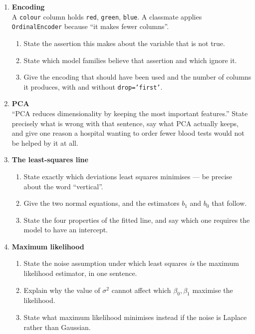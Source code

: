 \documentclass[11pt,a4paper]{article}
\begin{document}
\begin{enumerate}[label=\textbf{A\arabic*.}, leftmargin=*]
  \item \textbf{Encoding} \\
    A \texttt{colour} column holds \texttt{red}, \texttt{green}, \texttt{blue}.
    A classmate applies \texttt{OrdinalEncoder} because ``it makes fewer
    columns''.
    \begin{enumerate}[label=(\alph*), leftmargin=*]
      \item State the assertion this makes about the variable that is not true.
      \item State which model families believe that assertion and which ignore
        it.
      \item Give the encoding that should have been used and the number of
        columns it produces, with and without \texttt{drop='first'}.
    \end{enumerate}

  \item \textbf{PCA} \\
    ``PCA reduces dimensionality by keeping the most important features.''
    State precisely what is wrong with that sentence, say what PCA actually
    keeps, and give one reason a hospital wanting to order fewer blood tests
    would not be helped by it at all.

  \item \textbf{The least-squares line} \\
    \begin{enumerate}[label=(\alph*), leftmargin=*]
      \item State exactly which deviations least squares minimises --- be
        precise about the word ``vertical''.
      \item Give the two normal equations, and the estimators $b_1$ and $b_0$
        that follow.
      \item State the four properties of the fitted line, and say which one
        requires the model to have an intercept.
    \end{enumerate}

  \item \textbf{Maximum likelihood} \\
    \begin{enumerate}[label=(\alph*), leftmargin=*]
      \item State the noise assumption under which least squares \emph{is} the
        maximum likelihood estimator, in one sentence.
      \item Explain why the value of $\sigma^2$ cannot affect which
        $\beta_0, \beta_1$ maximise the likelihood.
      \item State what maximum likelihood minimises instead if the noise is
        Laplace rather than Gaussian.
    \end{enumerate}


\end{enumerate}
\end{document}
